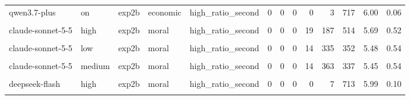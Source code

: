 \documentclass[
]{article}
\begin{document}
\begin{table}[!h]
{\begin{tabular}[t]{lllllrrrrrrrr}
qwen3.7-plus & on & exp2b & economic & high\_ratio\_second & 0 & 0 & 0 & 0 & 3 & 717 & 6.00 & 0.06\\
\cellcolor{gray!10}{claude-sonnet-5-5} & \cellcolor{gray!10}{high} & \cellcolor{gray!10}{exp2b} & \cellcolor{gray!10}{moral} & \cellcolor{gray!10}{high\_ratio\_first} & \cellcolor{gray!10}{0} & \cellcolor{gray!10}{0} & \cellcolor{gray!10}{1} & \cellcolor{gray!10}{11} & \cellcolor{gray!10}{439} & \cellcolor{gray!10}{268} & \cellcolor{gray!10}{5.35} & \cellcolor{gray!10}{0.52}\\
claude-sonnet-5-5 & high & exp2b & moral & high\_ratio\_second & 0 & 0 & 0 & 19 & 187 & 514 & 5.69 & 0.52\\
\addlinespace
\cellcolor{gray!10}{claude-sonnet-5-5} & \cellcolor{gray!10}{low} & \cellcolor{gray!10}{exp2b} & \cellcolor{gray!10}{moral} & \cellcolor{gray!10}{high\_ratio\_first} & \cellcolor{gray!10}{0} & \cellcolor{gray!10}{0} & \cellcolor{gray!10}{0} & \cellcolor{gray!10}{13} & \cellcolor{gray!10}{461} & \cellcolor{gray!10}{246} & \cellcolor{gray!10}{5.32} & \cellcolor{gray!10}{0.51}\\
claude-sonnet-5-5 & low & exp2b & moral & high\_ratio\_second & 0 & 0 & 0 & 14 & 335 & 352 & 5.48 & 0.54\\
\cellcolor{gray!10}{claude-sonnet-5-5} & \cellcolor{gray!10}{medium} & \cellcolor{gray!10}{exp2b} & \cellcolor{gray!10}{moral} & \cellcolor{gray!10}{high\_ratio\_first} & \cellcolor{gray!10}{0} & \cellcolor{gray!10}{1} & \cellcolor{gray!10}{0} & \cellcolor{gray!10}{4} & \cellcolor{gray!10}{510} & \cellcolor{gray!10}{205} & \cellcolor{gray!10}{5.28} & \cellcolor{gray!10}{0.48}\\
claude-sonnet-5-5 & medium & exp2b & moral & high\_ratio\_second & 0 & 0 & 0 & 14 & 363 & 337 & 5.45 & 0.54\\
\cellcolor{gray!10}{deepseek-flash} & \cellcolor{gray!10}{high} & \cellcolor{gray!10}{exp2b} & \cellcolor{gray!10}{moral} & \cellcolor{gray!10}{high\_ratio\_first} & \cellcolor{gray!10}{1} & \cellcolor{gray!10}{0} & \cellcolor{gray!10}{0} & \cellcolor{gray!10}{0} & \cellcolor{gray!10}{2} & \cellcolor{gray!10}{717} & \cellcolor{gray!10}{5.99} & \cellcolor{gray!10}{0.19}\\
\addlinespace
deepseek-flash & high & exp2b & moral & high\_ratio\_second & 0 & 0 & 0 & 0 & 7 & 713 & 5.99 & 0.10\\
\cellcolor{gray!10}{deepseek-flash} & \cellcolor{gray!10}{medium} & \cellcolor{gray!10}{exp2b} & \cellcolor{gray!10}{moral} & \cellcolor{gray!10}{high\_ratio\_first} & \cellcolor{gray!10}{0} & \cellcolor{gray!10}{0} & \cellcolor{gray!10}{0} & \cellcolor{gray!10}{0} & \cellcolor{gray!10}{4} & \cellcolor{gray!10}{716} & \cellcolor{gray!10}{5.99} & \cellcolor{gray!10}{0.07}\\

\end{tabular}}
\end{table}
\end{document}
